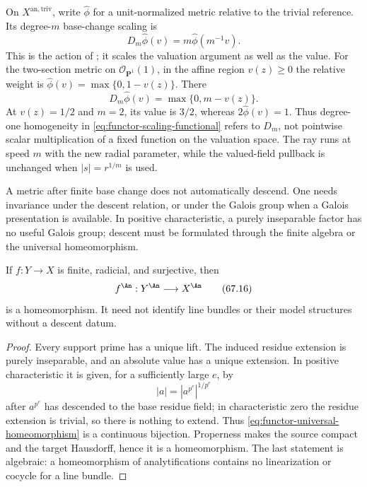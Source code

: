 \begin{example}
\label{ex:functor-base-change-action}
On $X^{\mathrm{an,triv}}$, write $\widehat\phi$ for a unit-normalized
metric relative to the trivial reference. Its degree-$m$ base-change
scaling is
\[
 D_m\widehat\phi(v)=m\widehat\phi(m^{-1}v).
\tag{67.15a}\label{eq:functor-base-change-action}
\]
This is the action of \cite[Section~6.3]{BHJ17}; it scales the valuation
argument as well as the value. For the two-section metric on
$\mathcal O_{\mathbf P^1}(1)$, in the affine region $v(z)\geq0$ the
relative weight is $\widehat\phi(v)=\max\{0,1-v(z)\}$. There
\[
 D_m\widehat\phi(v)=\max\{0,m-v(z)\}.
\]
At $v(z)=1/2$ and $m=2$, its value is $3/2$, whereas
$2\widehat\phi(v)=1$. Thus degree-one homogeneity in
\eqref{eq:functor-scaling-functional} refers to $D_m$, not pointwise
scalar multiplication of a fixed function on the valuation space.
The ray runs at speed $m$ with the new radial parameter, while the
valued-field pullback is unchanged when $|s|=r^{1/m}$ is used.
\end{example}

\begin{remark}
\label{rem:functor-descent-datum}
A metric after finite base change does not automatically descend.
One needs invariance under the descent relation, or under the Galois
group when a Galois presentation is available. In positive
characteristic, a purely inseparable factor has no useful Galois
group; descent must be formulated through the finite algebra or the
universal homeomorphism.
\end{remark}

\begin{proposition}\label{prop:functor-universal-homeomorphism}
If $f:Y\to X$ is finite, radicial, and surjective, then
\[
                    f^{\An}:Y^{\An}\longrightarrow X^{\An}
\tag{67.16}\label{eq:functor-universal-homeomorphism}
\]
is a homeomorphism. It need not identify line bundles or their model
structures without a descent datum.
\end{proposition}

\begin{proof}
Every support prime has a unique lift. The induced residue extension
is purely inseparable, and an absolute value has a unique extension. In
positive characteristic it is given, for a sufficiently large $e$, by
\[
                         |a|=|a^{p^e}|^{1/p^e}
\]
after $a^{p^e}$ has descended to the base residue field; in
characteristic zero the residue extension is trivial, so there is
nothing to extend. Thus \eqref{eq:functor-universal-homeomorphism}
is a continuous bijection. Properness makes the source compact and
the target Hausdorff, hence it is a homeomorphism. The last statement
is algebraic: a homeomorphism of analytifications contains no
linearization or cocycle for a line bundle.
\end{proof}


